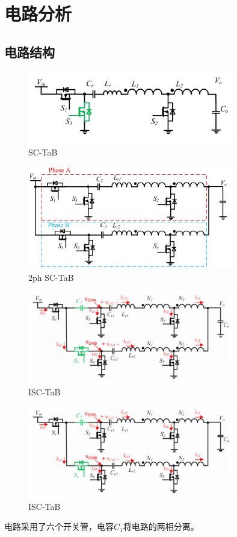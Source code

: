 \documentclass[12pt,a4paper]{report}
\begin{document}
\chapter{电路分析}
\section{电路结构}
\begin{figure}[h]
    \centering
    \includegraphics[width = 0.8\textwidth]{figures/SC-TaB.png}
    \caption{SC-TaB}
\end{figure}
\begin{figure}[h]
    \centering
    \includegraphics[width = 0.8\textwidth]{figures/2ph SC-TaB.png}
    \caption{2ph SC-TaB}
\end{figure}
\begin{figure}[h]
    \centering
    \includegraphics[width = 0.8\textwidth]{figures/circuit diagram1.png}
    \caption{ISC-TaB}
\end{figure}
\begin{figure}[h]
    \centering
    \includegraphics[width = 0.8\textwidth]{figures/circuit diagram1.png}
    \caption{ISC-TaB}
\end{figure}
电路采用了六个开关管，电容$C_1$将电路的两相分离。
\end{document}
